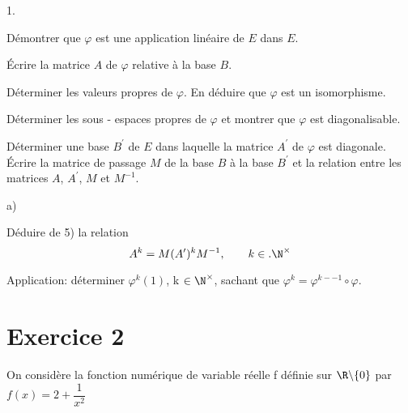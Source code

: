 \documentclass[11pt]{article}%
\begin{document}
\begin{noliste}{1.}
 \setlength{\itemsep}{4mm}
\item Démontrer que $\varphi $ est une application linéaire de $E$ dans
$E$.

\item Écrire la matrice $A$ de $\varphi $ relative à la base $B$.

\item Déterminer les valeurs propres de $\varphi $. En déduire que
$\varphi $
est un isomorphisme.

\item Déterminer les sous - espaces propres de $\varphi $ et montrer
que $\varphi $ est diagonalisable.

\item Déterminer une base $B^{\prime }$ de $E$ dans laquelle la matrice
$A^{\prime }$ de $\varphi $ est diagonale.\\
Écrire la matrice de passage $M$ de la base $B$ à la base $B^{\prime }$
et
la relation entre les matrices $A$, $A^{\prime }$, $M$ et $M^{- 1}$.

\item 

\begin{noliste}{a)}
 \setlength{\itemsep}{2mm}
\item Déduire de 5) la relation
\[
A^{k} = M(A^{\prime })^{k}M^{- 1},\qquad k\in.\N^{\times }
\]

\item Application: déterminer $\varphi ^{k}(1)$, k $\in \N^{\times }$,
sachant que $\varphi ^{k} = \varphi ^{k - -1}\circ \varphi $.
\end{noliste}
\end{noliste}

\section*{Exercice 2}

On considère la fonction numérique de variable réelle f définie sur
$\R\backslash \{0\}$ par $f(x) = 2 + \dfrac{1}{x^{2}}$
\end{document}
